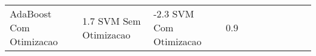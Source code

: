 \begin{table}[H]
\begin{adjustwidth}{ -1in }{ -1in }
\begin{tabular}{lllllllllll}
           AdaBoost Com Otimizacao &       1.7%
                SVM Sem Otimizacao &      -2.3%
                SVM Com Otimizacao &       0.9%
\bottomrule
\end{tabular}
    \end{adjustwidth}
    \renewcommand{\arraystretch}{1.0} %
\end{table}
